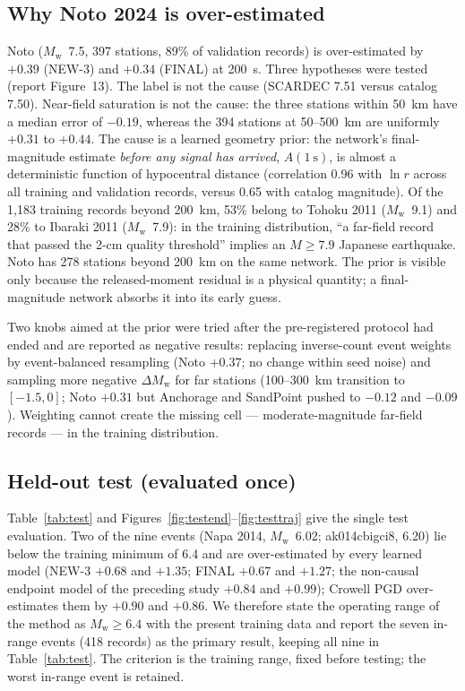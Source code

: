 \documentclass[12pt,letterpaper]{article}
\newcommand{\Mw}{M_{\mathrm{w}}}
\begin{document}
\subsection{Why Noto 2024 is over-estimated}

Noto ($\Mw$~7.5, 397 stations, 89\% of validation records) is over-estimated by $+0.39$ (NEW-3) and $+0.34$ (FINAL) at 200~s. Three hypotheses were tested (report Figure~13). The label is not the cause (SCARDEC 7.51 versus catalog 7.50). Near-field saturation is not the cause: the three stations within 50~km have a median error of $-0.19$, whereas the 394 stations at 50--500~km are uniformly $+0.31$ to $+0.44$. The cause is a learned geometry prior: the network's final-magnitude estimate \emph{before any signal has arrived}, $A(1~\mathrm{s})$, is almost a deterministic function of hypocentral distance (correlation 0.96 with $\ln r$ across all training and validation records, versus 0.65 with catalog magnitude). Of the 1,183 training records beyond 200~km, 53\% belong to Tohoku 2011 ($\Mw$~9.1) and 28\% to Ibaraki 2011 ($\Mw$~7.9): in the training distribution, ``a far-field record that passed the 2-cm quality threshold'' implies an $M\geq7.9$ Japanese earthquake. Noto has 278 stations beyond 200~km on the same network. The prior is visible only because the released-moment residual is a physical quantity; a final-magnitude network absorbs it into its early guess.

Two knobs aimed at the prior were tried after the pre-registered protocol had ended and are reported as negative results: replacing inverse-count event weights by event-balanced resampling (Noto $+0.37$; no change within seed noise) and sampling more negative $\Delta\Mw$ for far stations (100--300~km transition to $[-1.5,0]$; Noto $+0.31$ but Anchorage and SandPoint pushed to $-0.12$ and $-0.09$). Weighting cannot create the missing cell --- moderate-magnitude far-field records --- in the training distribution.

\subsection{Held-out test (evaluated once)}

Table~\ref{tab:test} and Figures~\ref{fig:testend}--\ref{fig:testtraj} give the single test evaluation. Two of the nine events (Napa 2014, $\Mw$~6.02; ak014cbigci8, 6.20) lie below the training minimum of 6.4 and are over-estimated by every learned model (NEW-3 $+0.68$ and $+1.35$; FINAL $+0.67$ and $+1.27$; the non-causal endpoint model of the preceding study $+0.84$ and $+0.99$); Crowell PGD over-estimates them by $+0.90$ and $+0.86$. We therefore state the operating range of the method as $\Mw\geq6.4$ with the present training data and report the seven in-range events (418 records) as the primary result, keeping all nine in Table~\ref{tab:test}. The criterion is the training range, fixed before testing; the worst in-range event is retained.
\end{document}
